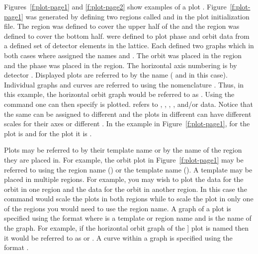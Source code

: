 Figures~\ref{f:plot-page1} and \ref{f:plot-page2} show examples of a
plot . Figure~\ref{f:plot-page1} was generated by defining
two regions called  and  in the plot initialization
file. The  region was defined to cover the upper half of the
 and the  region was defined to cover the bottom
half.  were defined to plot phase and orbit data
from a defined set of detector elements in the lattice. Each
 defined two graphs which in both cases where
assigned the names  and . The orbit  was
placed in the  region and the phase  was
placed in the  region. The horizontal axis numbering is by
detector .  Displayed plots are referred to by the
 name ( and  in this case). Individual
graphs and curves are referred to using the nomenclature
. Thus, in this example, the horizontal orbit graph
would be referred to as .  Using the  command one
can then specify  is plotted.  refers to
, , , , and/or
 data.  Notice that the same  can be
assigned to different  and the plots in different
 can have different scales for their axes or different
. In the example in Figure~\ref{f:plot-page1},  for
the  plot is  and for the  plot it is
.

Plots may be referred to by their template name or by the name of the 
region they are placed in. For example, the orbit plot in 
Figure~\ref{f:plot-page1} may be referred to using the region name ()
or the template name (). A template may be placed in multiple regions.
For example, you may wish to plot the  data for the orbit in one
region and the   data for the orbit in another region. In this case 
the command  would scale the plots in both regions while to scale
the plot in only one of the regions you would need to use the region name. A graph
of a plot is specified using the format  where 
is a template or region name and  is the name of the graph. For example,
if the horizontal orbit graph of the ] plot is named  then it would
be referred to as  or . A curve
within a graph is specified using the format .

